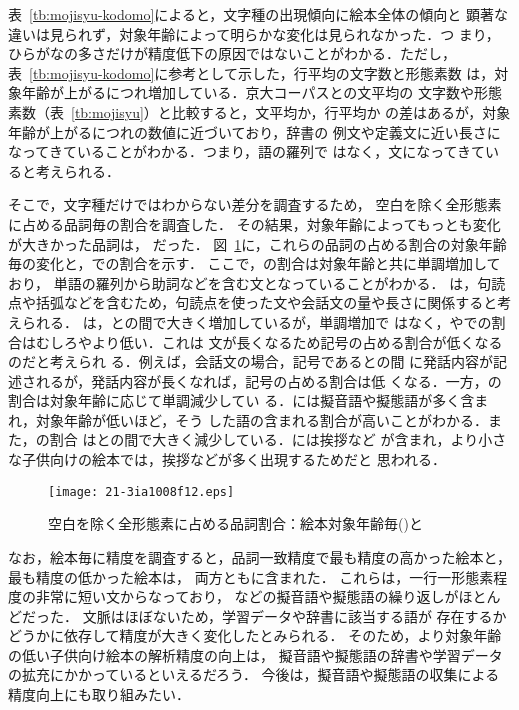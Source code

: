\documentclass[japanese]{jnlp_1.4}
\newcommand{\kodomo}{}
\newcommand{\kod}[1]{}
\newcommand{\lxd}{}
\newcommand{\pos}[1]{}
\begin{document}
 表~\ref{tb:mojisyu-kodomo}によると，文字種の出現傾向に絵本全体の傾向と
 顕著な違いは見られず，対象年齢によって明らかな変化は見られなかった．つ
 まり，ひらがなの多さだけが精度低下の原因ではないことがわかる．ただし，
 表~\ref{tb:mojisyu-kodomo}に参考として示した，行平均の文字数と形態素数
 は，対象年齢が上がるにつれ増加している．京大コーパスと\lxd の文平均の
 文字数や形態素数（表~\ref{tb:mojisyu}）と比較すると，文平均か，行平均か
 の差はあるが，対象年齢が上がるにつれ\lxd の数値に近づいており，辞書の
 例文や定義文に近い長さになってきていることがわかる．つまり，語の羅列で
 はなく，文になってきていると考えられる．


そこで，文字種だけではわからない差分を調査するため，
空白を除く全形態素に占める品詞毎の割合を調査した．
その結果，対象年齢によってもっとも変化が大きかった品詞は，\pos{助詞}\pos{記号}
\pos{副詞}\pos{感動詞}だった．
図~\ref{fig:age-hinshi}に，これらの品詞の占める割合の対象年齢毎の変化と，\lxd での割合を示す．
ここで，\pos{助詞}の割合は対象年齢と共に単調増加しており，
単語の羅列から助詞などを含む文となっていることがわかる．
\pos{記号}は，句読点や括弧などを含むため，句読点を使った文や会話文の量や長さに関係すると考えられる．
\pos{記号}は，\kod{012}と\kod{3}の間で大きく増加しているが，単調増加で
はなく，\kod{5}や\lxd での割合はむしろ\kod{3}や\kod{4}より低い．これは
文が長くなるため記号の占める割合が低くなるのだと考えられ
る．例えば，会話文の場合，記号である\jpn[「]{}と\jpn[」]{}の間
  に発話内容が記述されるが，発話内容が長くなれば，記号の占める割合は低
  くなる．一方，\pos{副詞}の割合は対象年齢に応じて単調減少してい
る．\pos{副詞}には擬音語や擬態語が多く含まれ，対象年齢が低いほど，そう
した語の含まれる割合が高いことがわかる．また，\pos{感動詞}の割合
は\kod{012}と\kod{3}の間で大きく減少している．\pos{感動詞}には挨拶など
が含まれ，より小さな子供向けの絵本では，挨拶などが多く出現するためだと
思われる．

 \begin{figure}[b]
   \begin{center}
    \texttt{[image: 21-3ia1008f12.eps]}
   \end{center}
 \caption{空白を除く全形態素に占める品詞割合：絵本対象年齢毎(\kodomo)と\lxd}
  \label{fig:age-hinshi}
 \end{figure}

なお，絵本毎に精度を調査すると，品詞一致精度で最も精度の高かった絵本と，最も精度の低かった絵本は，
両方とも\kod{012}に含まれた．
これらは，一行一形態素程度の非常に短い文からなっており，
\jpn[ぴょん]{}\jpn[ぼちゃん]{}\jpn[ぶらぶら]{}などの擬音語や擬態語の繰り返しがほとんどだった．
文脈はほぼないため，学習データや辞書に該当する語が
存在するかどうかに依存して精度が大きく変化したとみられる．
そのため，より対象年齢の低い子供向け絵本の解析精度の向上は，
擬音語や擬態語の辞書や学習データの拡充にかかっているといえるだろう．
今後は，擬音語や擬態語の収集による精度向上にも取り組みたい．
\end{document}
